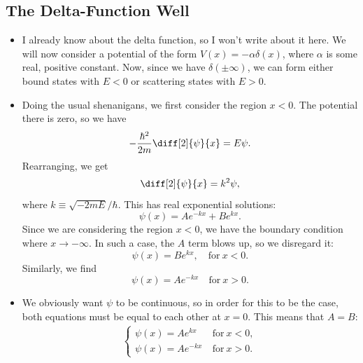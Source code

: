 \subsection*{The Delta-Function Well}
\begin{itemize}
    \item I already know about the delta function, so I won't write about it here. We will now consider a potential of the form $V(x) = -\alpha\delta(x)$, where $\alpha$ is some real, positive constant. Now, since we have $\delta(\pm\infty)$, we can form either bound states with $E<0$ or scattering states with $E>0$.
    \item Doing the usual shenanigans, we first consider the region $x<0$. The potential there is zero, so we have
        \begin{equation*}
            -\frac{\hbar^2}{2m}\diff[2]{\psi}{x} = E\psi.
        \end{equation*}
        Rearranging, we get
        \begin{equation*}
            \diff[2]{\psi}{x} = k^2\psi,
        \end{equation*}
        where $k \equiv \sqrt{-2mE}/\hbar$. This has real exponential solutions:
        \begin{equation*}
            \psi(x) = Ae^{-kx} + Be^{kx}.
        \end{equation*}
        Since we are considering the region $x<0$, we have the boundary condition where $x \rightarrow -\infty$. In such a case, the $A$ term blows up, so we disregard it:
        \begin{equation*}
            \psi(x) = Be^{kx}, \quad \mathrm{for}\ x<0.
        \end{equation*}
        Similarly, we find 
        \begin{equation*}
            \psi(x) = Ae^{-kx} \quad \mathrm{for}\ x>0.
        \end{equation*}
    \item We obviously want $\psi$ to be continuous, so in order for this to be the case, both equations must be equal to each other at $x=0$. This means that $A=B$:
        \begin{equation*}
            \begin{alignedat}{1}
            \begin{cases}
                \psi(x) = Ae^{kx}\ &\mathrm{for}\ x<0, \\
                \psi(x) = Ae^{-kx}\ &\mathrm{for}\ x>0.
            \end{cases}

\end{alignedat}
\end{equation*}
\end{itemize}

